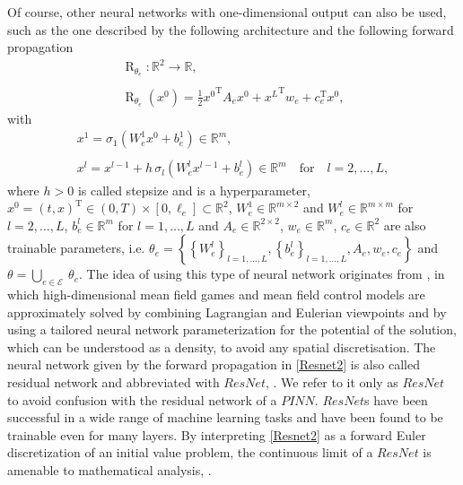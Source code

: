 Of course, other neural networks with one-dimensional output can also be used, such as the one described by the following architecture and the following forward propagation 
\begin{equation} 
    \label{Resnet1}
    \begin{gathered}
        \operatorname{R}_{\theta_e} \colon \mathbb{R}^2 \to \mathbb{R}, \\
        \\
        \operatorname{R}_{\theta_e}\left(x^0\right) = \frac{1}{2} {x^0}^{\mathrm{T}} A_e x^0 + {x^{L}}^{\mathrm{T}} w_e + c^{\mathrm{T}}_e x^0,
    \end{gathered} 
\end{equation} 
with
\begin{equation}
    \label{Resnet2} 
    \begin{gathered}
        x^1 = \sigma_1\left(W^1_e x^{0} + b^1_e\right) \in \mathbb{R}^m, \\
        \\
        x^l = x^{l-1} + h \, \sigma_l\left(W^l_e x^{l-1} + b^l_e\right) \in \mathbb{R}^m \quad \text{for} \quad l = 2, \ldots, L, 
    \end{gathered} 
\end{equation} 
where $h > 0$ is called stepsize and is a hyperparameter, $x^0 = \left(t, x\right)^{\mathrm{T}} \in \left(0, T\right) \times \left[0, \ell_e\right] \subset \mathbb{R}^2$, $W^1_e \in \mathbb{R}^{m \times 2}$ and $W^l_e \in \mathbb{R}^{m \times m}$ for $l = 2, \ldots, L$, $b^l_e \in \mathbb{R}^{m}$ for $l = 1, \ldots, L$ and $A_e \in \mathbb{R}^{2 \times 2}$, $w_e \in \mathbb{R}^m$, $c_e \in \mathbb{R}^2$ are also trainable parameters, i.e. $\theta_e = \left\{ \left\{ W^l_e \right\}_{l = 1, \ldots, L}, \left\{ b^l_e \right\}_{l = 1, \ldots, L}, A_e, w_e, c_e \right\}$ and $\theta = \bigcup_{e \in \mathcal{E}} \ \theta_e$. The idea of using this type of neural network originates from \cite{RuthottoOsherLiNurbekyanFung2020}, in which high-dimensional mean field games and mean field control models are approximately solved by combining Lagrangian and Eulerian viewpoints and by using a tailored neural network parameterization for the potential of the solution, which can be understood as a density, to avoid any spatial discretisation. The neural network given by the forward propagation in \cref{Resnet2} is also called residual network and abbreviated with $ResNet$, \cite{HeZhangRenSun:2015}. We refer to it only as $ResNet$ to avoid confusion with the residual network of a $PINN$. $ResNet$s have been successful in a wide range of machine learning tasks and have been found to be trainable even for many layers. By interpreting \cref{Resnet2} as a forward Euler discretization of an initial value problem, the continuous limit of a $ResNet$ is amenable to mathematical analysis, \cite[p.~6]{RuthottoOsherLiNurbekyanFung2020}. \\

